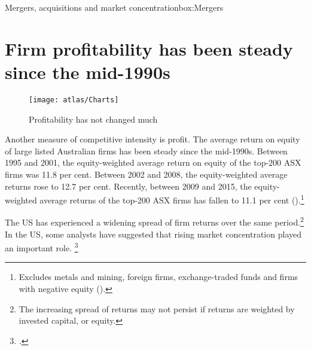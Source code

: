 \begin{bigbox}{Mergers, acquisitions and market concentration}{box:Mergers}
\end{bigbox}



\section{Firm profitability has been steady since the mid-1990s}

\begin{figure}
    \caption{Profitability has not changed much \label{fig:ASXROEspreads}}
  \texttt{[image: atlas/Charts]} 
\end{figure}

Another measure of competitive intensity is profit. The average return on equity of large listed Australian firms has been steady since the mid-1990s. Between 1995 and 2001, the equity-weighted average return on equity of the top-200 ASX firms was 11.8 per cent. Between 2002 and 2008, the equity-weighted average returns rose to 12.7 per cent. Recently, between 2009 and 2015, the equity-weighted average returns of the top-200 ASX firms has fallen to 11.1 per cent ().\footnote{Excludes metals and mining, foreign firms, exchange-traded funds and firms with negative equity (\textcite{Morningstar2017}).}


The US has experienced a widening spread of firm returns over the same period.\footnote{\textcite{Econtoohigh2016} The increasing spread of returns may not persist if returns are weighted by invested capital, or equity.} 
In the US, some analysts have suggested that rising market concentration played an important role.%
    \footcites{CEAcompetitionbriefmay2016}{Ganapati_concen_2017}


